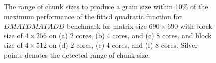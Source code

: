 \begin{figure}[H]
	\hfill
	\caption{The range of chunk sizes to produce a grain size within $10\%$ of the maximum performance of the fitted quadratic function for $DMATDMATADD$ benchmark for matrix size $690\times690$ with block size of $4\times256$ on (a) $2$ cores, (b) $4$ cores, and (c) $8$ cores, and block size of $4\times512$ on (d) $2$ cores, (e) $4$ cores, and (f) $8$ cores. Silver points denotes the detected range of chunk size.}	
	\label{fig14}
\end{figure}


